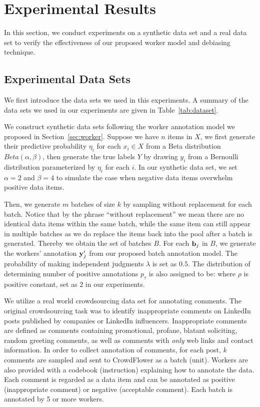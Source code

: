 \section{Experimental Results}
\label{sec:exp}

In this section, we conduct experiments on a synthetic data set and a real data set 
to verify the effectiveness of our proposed worker model and debiasing technique.  

\subsection{Experimental Data Sets}
We first introduce the data sets we used in this experiments.  
A summary of the data sets we used in our experiments are given in Table~\ref{tab:dataset}.  

We construct synthetic data sets following the worker annotation model we proposed in Section~\ref{sec:worker}.
Suppose we have $n$ items in $X$, 
we first generate their predictive probability $\eta_i$ for each $x_i \in X$ 
from a Beta distribution $Beta(\alpha, \beta)$, 
then generate the true labels $Y$ by drawing $y_i$ from a Bernoulli distribution parameterized by $\eta_i$ for each $i$.  
In our synthetic data set, we set $\alpha = 2$ and $\beta = 4$ to simulate the case when negative data items overwhelm positive data items.

Then, we generate $m$ batches of size $k$ by sampling without replacement for each batch.  
Notice that by the phrase ``without replacement'' we mean there are no identical data items within the same batch, 
while the same item can still appear in multiple batches 
as we do replace the items back into the pool after a batch is generated.  
Thereby we obtain the set of batches $B$.  
For each ${\mathbf{b}}_j$ in $B$, we generate the workers' annotation ${\mathbf{y}}_j'$ from our proposed batch annotation model.  
The probability of making independent judgments $\lambda$ is set as $0.5$.
The distribution of determining number of positive annotations $p_{\tau}$ is also assigned to be:
%
where $\rho$ is positive constant, set as $2$ in our experiments.  

We utilize a real world crowdsourcing data set for annotating comments.  
The original crowdsourcing task was to identify inappropriate comments on LinkedIn posts published by companies or LinkedIn influencers.  
Inappropriate comments are defined as comments containing promotional, profane, blatant soliciting, random greeting comments, 
as well as comments with \emph{only} web links and contact information.  
In order to collect annotation of comments, 
for each post, $k$ comments are sampled and sent to CrowdFlower as a batch (unit).  
Workers are also provided with a codebook (instruction) explaining how to annotate the data.  
Each comment is regarded as a data item and can be annotated as positive (inappropriate comment) or negative (acceptable comment).  
Each batch is annotated by 5 or more workers.  


